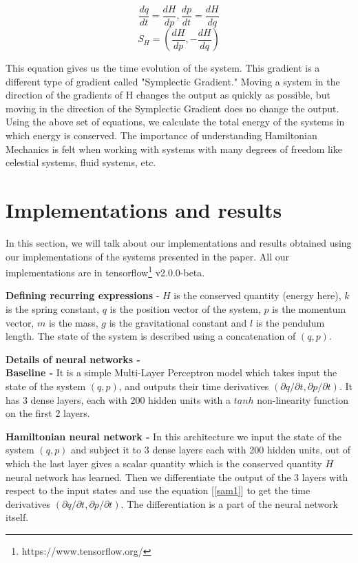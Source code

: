 \begin{equation}\label{sam1}
\frac{dq}{dt} = \frac{dH}{dp}, \frac{dp}{dt} = \frac{dH}{dq}
\end{equation}
\begin{equation}
S_H = \left( \frac{dH}{dp}, - \frac{dH}{dq}  \right)
\end{equation}

This equation gives us the time evolution of the system. This gradient is a different type of gradient called "Symplectic Gradient." Moving a system in the direction of the gradients of H changes the output as quickly as possible, but moving in the direction of the Symplectic Gradient does no change the output. Using the above set of equations, we calculate the total energy of the systems in which energy is conserved. The importance of understanding Hamiltonian Mechanics is felt when working with systems with many degrees of freedom like celestial systems, fluid systems, etc.  




\section{Implementations and results}
In this section, we will talk about our implementations and results obtained using our implementations of the systems presented in the paper. All our implementations are in tensorflow\footnote{https://www.tensorflow.org/} v2.0.0-beta.

\textbf{Defining recurring expressions} - \(H\) is the conserved quantity (energy here), \(k\) is the spring constant, \(q\) is the position vector of the system, \(p\) is the momentum vector, \(m\) is the mass, \(g\) is the gravitational constant and \(l\) is the pendulum length. The state of the system is described using a concatenation of \((q, p)\).

\textbf{Details of neural networks -}\\
\textbf{Baseline - } It is a simple Multi-Layer Perceptron model which takes input the state of the system \((q, p)\), and outputs their time derivatives \((\partial q/\partial t, \partial p/\partial t)\). It has 3 dense layers, each with 200 hidden units with a \(tanh\) non-linearity function on the first 2 layers.

\textbf{Hamiltonian neural network - } In this architecture we input the state of the system \((q, p)\) and subject it to 3 dense layers each with 200 hidden units, out of which the last layer gives a scalar quantity which is the conserved quantity \(H\) neural network has learned. Then we differentiate the output of the 3 layers with respect to the input states and use the equation [\ref{sam1}] to get the time derivatives \((\partial q/\partial t, \partial p/\partial t)\). The differentiation is a part of the neural network itself.

